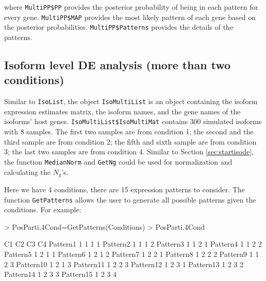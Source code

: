 \documentclass{article}
\begin{document}
\noindent where \verb+MultiPP$PP+ provides the posterior probability of being in each pattern for every gene. 
\verb+MultiPP$MAP+ provides the most likely pattern of each gene based on the posterior 
probabilities. \verb+MultiPP$Patterns+ provides the details of the patterns. 



\subsection{Isoform level DE analysis (more than two conditions)}
\label{sec:startisomulticond}
\noindent Similar to \verb+IsoList+,
the object \verb+IsoMultiList+ is an object containing the isoform expression estimates matrix, the isoform 
names, and the gene names of the isoforms' host genes. 
\verb+IsoMultiList$IsoMultiMat+ contains 300 simulated isoforms with 8 samples. 
The first two samples are from condition 1; the second and the third sample are 
from condition 2; the fifth and sixth sample are from condition 3; 
the last two samples are from condition 4.
Similar to Section \ref{sec:startisode},  the function \verb+MedianNorm+ and \verb+GetNg+ could be used for normalization 
and calculating the $N_g$'s. 
\begin{Schunk}
\end{Schunk}
Here we have 4 conditions, there are 15 expression
patterns to consider. 
The function \verb+GetPatterns+ allows the user to generate all possible patterns given the conditions. For example:

\begin{Schunk}
\begin{Sinput}
> PosParti.4Cond=GetPatterns(Conditions)
> PosParti.4Cond
\end{Sinput}
\begin{Soutput}
          C1 C2 C3 C4
Pattern1   1  1  1  1
Pattern2   1  1  1  2
Pattern3   1  1  2  1
Pattern4   1  1  2  2
Pattern5   1  2  1  1
Pattern6   1  2  1  2
Pattern7   1  2  2  1
Pattern8   1  2  2  2
Pattern9   1  1  2  3
Pattern10  1  2  1  3
Pattern11  1  2  2  3
Pattern12  1  2  3  1
Pattern13  1  2  3  2
Pattern14  1  2  3  3
Pattern15  1  2  3  4
\end{Soutput}
\end{Schunk}
\end{document}
